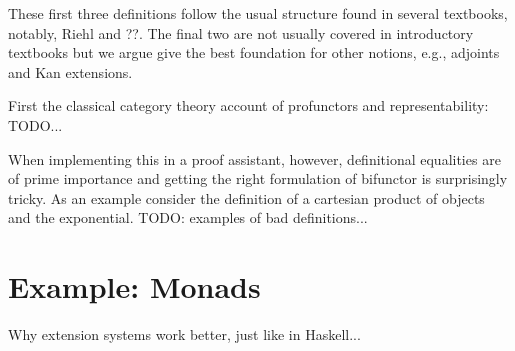 \documentclass{article}
\begin{document}
These first three definitions follow the usual structure found in
several textbooks, notably, Riehl and ??. The final two are not
usually covered in introductory textbooks but we argue give the best
foundation for other notions, e.g., adjoints and Kan extensions.

First the classical category theory account of profunctors and representability: TODO...

When implementing this in a proof assistant, however, definitional
equalities are of prime importance and getting the right formulation
of bifunctor is surprisingly tricky. As an example consider the
definition of a cartesian product of objects and the exponential. TODO: examples of bad definitions...

\section{Example: Monads}

Why extension systems work better, just like in Haskell...
\end{document}
